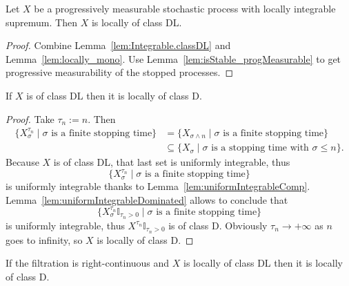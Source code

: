 \begin{lemma}\label{lem:HasLocallyIntegrableSup.locally_classDL}
  \leanok
Let $X$ be a progressively measurable stochastic process with locally integrable supremum. Then $X$ is locally of class DL.
\end{lemma}

\begin{proof}\leanok
Combine Lemma~\ref{lem:Integrable.classDL} and Lemma~\ref{lem:locally_mono}. Use Lemma~\ref{lem:isStable_progMeasurable} to get progressive measurability of the stopped processes.
\end{proof}


\begin{lemma}\label{lem:ClassDL.locally_classD}
  \leanok
If $X$ is of class DL then it is locally of class D.
\end{lemma}

\begin{proof}
  \leanok
Take $\tau_n := n$. Then
\begin{align*}
  \{X^{\tau_n}_\sigma \mid \sigma \text{ is a finite stopping time}\} & = \{X_{\sigma \land n} \mid \sigma \text{ is a finite stopping time}\} \\
  & \subseteq \{X_\sigma \mid \sigma \text{ is a stopping time with } \sigma \le n\}.
\end{align*}
Because $X$ is of class DL, that last set is uniformly integrable, thus
$$\{X^{\tau_n}_\sigma \mid \sigma \text{ is a finite stopping time}\}$$
is uniformly integrable thanks to Lemma~\ref{lem:uniformIntegrableComp}. Lemma~\ref{lem:uniformIntegrableDominated} allows to conclude that
$$\{X^{\tau_n}_\sigma \mathbb{I}_{\tau_n > 0} \mid \sigma \text{ is a finite stopping time}\}$$
is uniformly integrable, thus $X^{\tau_n} \mathbb{I}_{\tau_n > 0}$ is of class D. Obviously $\tau_n \rightarrow +\infty$ as $n$ goes to infinity, so $X$ is locally of class D.
\end{proof}


\begin{lemma}\label{lem:locally_classD_of_locally_classDL}
  \leanok
If the filtration is right-continuous and $X$ is locally of class DL then it is locally of class D.
\end{lemma}

